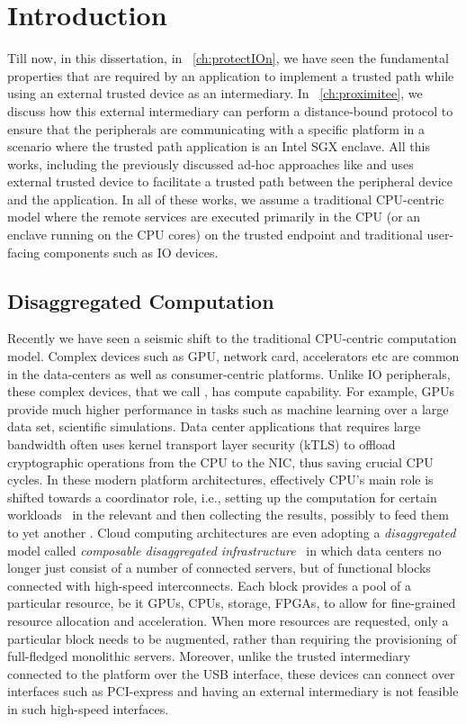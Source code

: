 \section{Introduction}
\label{sec: intro}


Till now, in this dissertation, in \protection~\ref{ch:protectIOn}, we have seen the fundamental properties that are required by an application to implement a trusted path while using an external trusted device as an intermediary. In \proximitee~\ref{ch:proximitee}, we  discuss how this external intermediary can perform a distance-bound protocol to ensure that the peripherals are communicating with a specific platform in a scenario where the trusted path application is an Intel SGX enclave. All this works, including the previously discussed ad-hoc approaches like \integrikey and \integriscreen uses external trusted device to facilitate a trusted path between the peripheral device and the application. In all of these works, we assume a traditional CPU-centric model where the remote services are executed primarily in the CPU (or an enclave running on the CPU cores) on the trusted endpoint and traditional user-facing components such as IO devices.

\subsection{Disaggregated Computation}

Recently we have seen a seismic shift to the traditional CPU-centric computation model. Complex devices such as GPU, network card, accelerators etc are common in the data-centers as well as consumer-centric platforms. Unlike IO peripherals, these complex devices, that we call \sphw, has compute capability. For example, GPUs provide much higher performance in tasks such as machine learning over a large data set, scientific simulations. Data center applications that requires large bandwidth often uses kernel transport layer security (kTLS) to offload cryptographic operations from the CPU to the NIC, thus saving crucial CPU cycles. In these modern platform architectures, effectively CPU's main role is shifted towards a coordinator role, i.e., setting up the computation for certain workloads~\cite{spec_hw_acc} in the relevant \sphw and then collecting the results, possibly to feed them to yet another \sphw. Cloud computing architectures are even adopting a \emph{disaggregated} model called \emph{composable disaggregated infrastructure}~\cite{disaggregatedcomp,fungible,meyer2017disaggregated,lim2009disaggregated} in which data centers no longer just consist of a number of connected servers, but of functional blocks connected with high-speed interconnects. Each block provides a pool of a particular resource, be it GPUs, CPUs, storage, FPGAs, to allow for fine-grained resource allocation and acceleration. When more resources are requested, only a particular block needs to be augmented, rather than requiring the provisioning of full-fledged monolithic servers. Moreover, unlike the trusted intermediary connected to the platform over the USB interface, these \sphw devices can connect over interfaces such as PCI-express and having an external intermediary is not feasible in such high-speed interfaces. 


